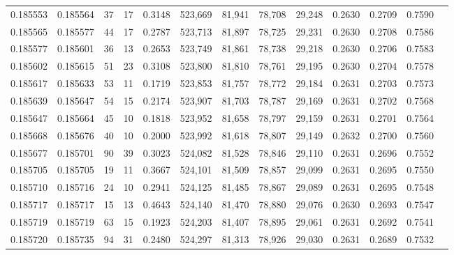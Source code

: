 \begin{tabular}{rrrrrrrrrrrrr}
0.185553 & 0.185564 &    37 &  17 &                                     0.3148 & 523,669 &  81,941 &  78,708 &  29,248 & 0.2630 & 0.2709 & 0.7590 \\
0.185565 & 0.185577 &    44 &  17 &                                     0.2787 & 523,713 &  81,897 &  78,725 &  29,231 & 0.2630 & 0.2708 & 0.7586 \\
0.185577 & 0.185601 &    36 &  13 &                                     0.2653 & 523,749 &  81,861 &  78,738 &  29,218 & 0.2630 & 0.2706 & 0.7583 \\
0.185602 & 0.185615 &    51 &  23 &                                     0.3108 & 523,800 &  81,810 &  78,761 &  29,195 & 0.2630 & 0.2704 & 0.7578 \\
0.185617 & 0.185633 &    53 &  11 &                                     0.1719 & 523,853 &  81,757 &  78,772 &  29,184 & 0.2631 & 0.2703 & 0.7573 \\
0.185639 & 0.185647 &    54 &  15 &                                     0.2174 & 523,907 &  81,703 &  78,787 &  29,169 & 0.2631 & 0.2702 & 0.7568 \\
0.185647 & 0.185664 &    45 &  10 &                                     0.1818 & 523,952 &  81,658 &  78,797 &  29,159 & 0.2631 & 0.2701 & 0.7564 \\
0.185668 & 0.185676 &    40 &  10 &                                     0.2000 & 523,992 &  81,618 &  78,807 &  29,149 & 0.2632 & 0.2700 & 0.7560 \\
0.185677 & 0.185701 &    90 &  39 &                                     0.3023 & 524,082 &  81,528 &  78,846 &  29,110 & 0.2631 & 0.2696 & 0.7552 \\
0.185705 & 0.185705 &    19 &  11 &                                     0.3667 & 524,101 &  81,509 &  78,857 &  29,099 & 0.2631 & 0.2695 & 0.7550 \\
0.185710 & 0.185716 &    24 &  10 &                                     0.2941 & 524,125 &  81,485 &  78,867 &  29,089 & 0.2631 & 0.2695 & 0.7548 \\
0.185717 & 0.185717 &    15 &  13 &                                     0.4643 & 524,140 &  81,470 &  78,880 &  29,076 & 0.2630 & 0.2693 & 0.7547 \\
0.185719 & 0.185719 &    63 &  15 &                                     0.1923 & 524,203 &  81,407 &  78,895 &  29,061 & 0.2631 & 0.2692 & 0.7541 \\
0.185720 & 0.185735 &    94 &  31 &                                     0.2480 & 524,297 &  81,313 &  78,926 &  29,030 & 0.2631 & 0.2689 & 0.7532 \\

\end{tabular}
